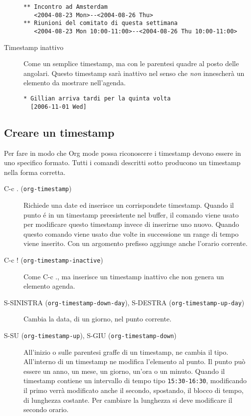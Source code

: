 \documentclass[11pt]{article}
\begin{document}
\begin{description}
\begin{verbatim}
** Incontro ad Amsterdam
   <2004-08-23 Mon>--<2004-08-26 Thu>
** Riunioni del comitato di questa settimana
   <2004-08-23 Mon 10:00-11:00>--<2004-08-26 Thu 10:00-11:00>
\end{verbatim}

\item[{Timestamp inattivo}] Come un semplice timestamp, ma con le parentesi quadre al posto
delle angolari. Questo timestamp sarà inattivo nel senso che \emph{non}
innescherà un elemento da mostrare nell'agenda.

\begin{verbatim}
* Gillian arriva tardi per la quinta volta
  [2006-11-01 Wed]
\end{verbatim}
\end{description}

\subsection{Creare un timestamp}
\label{sec:org638e9c2}
Per fare in modo che Org mode possa riconoscere i timestamp devono
essere in uno specifico formato. Tutti i comandi descritti sotto
producono un timestamp nella forma corretta.

\begin{description}
\item[{C-c . (\texttt{org-timestamp})}] Richiede una date ed inserisce un corrispondete timestamp. Quando il
punto é in un timestamp preesistente nel buffer, il comando viene
usato per modificare questo timestamp invece di inserirne uno
nuovo. Quando questo comando viene usato due volte in successione un
range di tempo viene inserito. Con un argomento prefisso aggiunge
anche l'orario corrente.

\item[{C-c ! (\texttt{org-timestamp-inactive})}] Come C-c ., ma inserisce un timestamp inattivo che non
genera un elemento agenda.

\item[{S-SINISTRA (\texttt{org-timestamp-down-day}), S-DESTRA (\texttt{org-timestamp-up-day})}] Cambia la data, di un giorno, nel punto corrente.

\item[{S-SU (\texttt{org-timestamp-up}), S-GIU (\texttt{org-timestamp-down})}] All'inizio o sulle parentesi graffe di un timestamp, ne cambia il
tipo. All'interno di un timestamp ne modifica l'elemento al
punto. Il punto può essere un anno, un mese, un giorno, un'ora o un
minuto. Quando il timestamp contiene un intervallo di tempo tipo
\texttt{15:30-16:30}, modificando il primo verrà modificato anche il
secondo, spostando, il blocco di tempo, di lunghezza costante. Per
cambiare la lunghezza si deve modificare il secondo orario.
\end{description}
\end{document}

